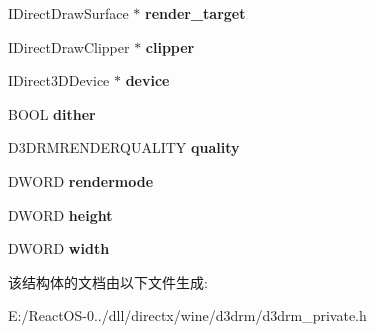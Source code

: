 \begin{DoxyCompactItemize}
\item 
\mbox{\label{structd3drm__device_a4aacd63d11de4f8a27c325b5e7d03086}} 
I\+Direct\+Draw\+Surface $\ast$ {\bfseries render\+\_\+target}
\item 
\mbox{\label{structd3drm__device_a99d098ef3c9ec214f2487698663ea6fc}} 
I\+Direct\+Draw\+Clipper $\ast$ {\bfseries clipper}
\item 
\mbox{\label{structd3drm__device_afc447817755967048abec4dd603dd1b3}} 
I\+Direct3\+D\+Device $\ast$ {\bfseries device}
\item 
\mbox{\label{structd3drm__device_a1e7b49f0a86b12709ccd479b3591b491}} 
B\+O\+OL {\bfseries dither}
\item 
\mbox{\label{structd3drm__device_a0a7e1cb612af8121a057739fbab4e7ec}} 
D3\+D\+R\+M\+R\+E\+N\+D\+E\+R\+Q\+U\+A\+L\+I\+TY {\bfseries quality}
\item 
\mbox{\label{structd3drm__device_a22b12d4e1fa150978cd3323861fc808d}} 
D\+W\+O\+RD {\bfseries rendermode}
\item 
\mbox{\label{structd3drm__device_ae137c22c497f249ecc16dd8d4b8ac072}} 
D\+W\+O\+RD {\bfseries height}
\item 
\mbox{\label{structd3drm__device_a62eed0d0f73a4c421d38448cc18278a7}} 
D\+W\+O\+RD {\bfseries width}
\end{DoxyCompactItemize}


该结构体的文档由以下文件生成\+:\begin{DoxyCompactItemize}
\item 
E\+:/\+React\+O\+S-\/0../dll/directx/wine/d3drm/d3drm\+\_\+private.\+h\end{DoxyCompactItemize}
